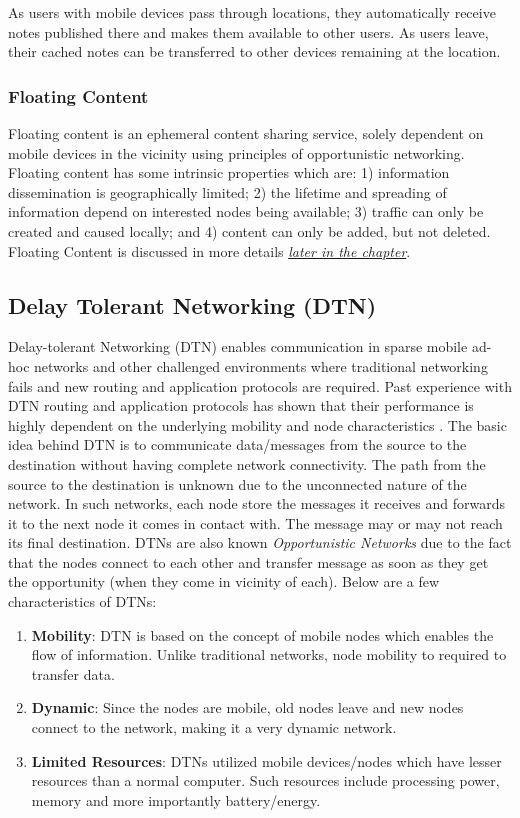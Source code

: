 As users with mobile devices pass through locations, they automatically receive notes published there and makes them available to other users. As users leave, their cached notes can be transferred to other devices remaining at the location.


\subsubsection{Floating Content \cite{floating-content}}
Floating content is an ephemeral content sharing service, solely dependent on mobile devices in the vicinity using principles of opportunistic networking. Floating content has some intrinsic properties which are: 1) information dissemination is geographically limited; 2) the lifetime and spreading of information depend on interested nodes being available; 3) traffic can only be created and caused locally; and 4) content can only be added, but not deleted. Floating Content is discussed in more details \hyperref[section:floating-content]{\emph{later in the chapter}}.

\subsection{Delay Tolerant Networking (DTN)}
Delay-tolerant Networking (DTN) \cite{fall-2003} enables communication in sparse mobile ad-hoc networks and other challenged environments where traditional networking fails and new routing and application protocols are required. Past experience with DTN routing and application protocols has shown that their performance is highly dependent on the underlying mobility and node characteristics \cite{keranen-theone}. The basic idea behind DTN is to communicate data/messages from the source to the destination without having complete network connectivity. The path from the source to the destination is unknown due to the unconnected nature of the network. In such networks, each node store the messages it receives and forwards it to the next node it comes in contact with. The message may or may not reach its final destination.\newline
DTNs are also known \textit{Opportunistic Networks} due to the fact that the nodes connect to each other and transfer message as soon as they get the opportunity (when they come in vicinity of each). Below are a few characteristics of DTNs:
\begin{enumerate}
  \item \textbf{Mobility}: DTN is based on the concept of mobile nodes which enables the flow of information. Unlike traditional networks, node mobility to required to transfer data.
  \item \textbf{Dynamic}: Since the nodes are mobile, old nodes leave and new nodes connect to the network, making it a very dynamic network.
  \item \textbf{Limited Resources}: DTNs utilized mobile devices/nodes which have lesser resources than a normal computer. Such resources include processing power, memory and more importantly battery/energy.
\end{enumerate}

